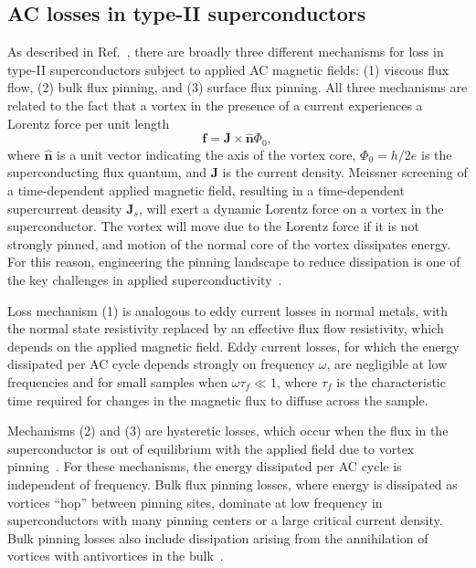 \documentclass[%
 reprint,
 superscriptaddress,
 amsmath,
 amssymb,
 amsfonts,
 aps,
 prb,
]{revtex4-2}
\renewcommand{\vec}{\mathbf}
\begin{document}
\subsection{AC losses in type-II superconductors}
\label{sec:ac-loss}

As described in Ref.~\cite{Clem1991-vq}, there are broadly three different mechanisms for loss in type-II superconductors subject to applied AC magnetic fields: (1) viscous flux flow, (2) bulk flux pinning, and (3) surface flux pinning. All three mechanisms are related to the fact that a vortex in the presence of a current experiences a Lorentz force per unit length
\begin{equation}
    \label{eq:lorentz}
    \mathbf{f}=\mathbf{J}\times\hat{\mathbf{n}}\Phi_0,
\end{equation}
where $\hat{\mathbf{n}}$ is a unit vector indicating the axis of the vortex core, $\Phi_0=h/2e$ is the superconducting flux quantum, and $\vec{J}$ is the current density. Meissner screening of a time-dependent applied magnetic field, resulting in a time-dependent supercurrent density $\mathbf{J}_s$, will exert a dynamic Lorentz force on a vortex in the superconductor. The vortex will move due to the Lorentz force if it is not strongly pinned, and motion of the normal core of the vortex dissipates energy. For this reason, engineering the pinning landscape to reduce dissipation is one of the key challenges in applied superconductivity~\cite{Eley2021-lu}.

Loss mechanism (1) is analogous to eddy current losses in normal metals, with the normal state resistivity replaced by an effective flux flow resistivity, which depends on the applied magnetic field. Eddy current losses, for which the energy dissipated per AC cycle depends strongly on frequency $\omega$, are negligible at low frequencies and for small samples when $\omega\tau_f\ll1$, where $\tau_f$ is the characteristic time required for changes in the magnetic flux to diffuse across the sample.

Mechanisms (2) and (3) are hysteretic losses, which occur when the flux in the superconductor is out of equilibrium with the applied field due to vortex pinning~\cite{Clem1994-qu}. For these mechanisms, the energy dissipated per AC cycle is independent of frequency. Bulk flux pinning losses, where energy is dissipated as vortices ``hop'' between pinning sites, dominate at low frequency in superconductors with many pinning centers or a large critical current density. Bulk pinning losses also include dissipation arising from the annihilation of vortices with antivortices in the bulk~\cite{Clem1979-tm}.
\end{document}
